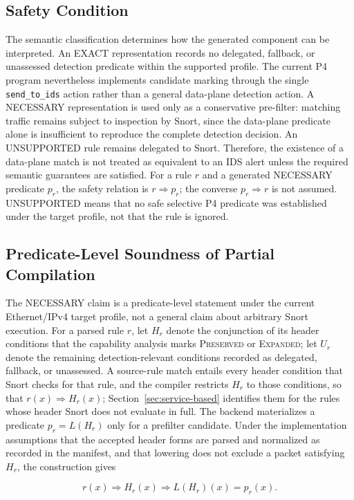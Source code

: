 \documentclass{article}
\begin{document}
\subsection{Safety Condition}
The semantic classification determines how the generated component can
be interpreted. An EXACT representation records no delegated, fallback, or
unassessed detection predicate within the supported profile. The current P4
program nevertheless implements candidate marking through the single
\texttt{send\_to\_ids} action rather than a general data-plane detection
action. A NECESSARY representation is used only as a conservative pre-filter: matching
traffic remains subject to inspection by Snort, since the data-plane
predicate alone is insufficient to reproduce the complete detection
decision. An UNSUPPORTED rule remains delegated to Snort. Therefore,
the existence of a data-plane match is not treated as equivalent to an
IDS alert unless the required semantic guarantees are satisfied.
For a rule $r$ and a generated NECESSARY predicate $p_r$, the safety
relation is $r \Rightarrow p_r$; the converse $p_r \Rightarrow r$ is not
assumed. UNSUPPORTED means that no safe selective P4 predicate was
established under the target profile, not that the rule is ignored.

\subsection{Predicate-Level Soundness of Partial Compilation}
The NECESSARY claim is a predicate-level statement under the current
Ethernet/IPv4 target profile, not a general claim about arbitrary Snort
execution. For a parsed rule $r$, let $H_r$ denote the conjunction of its
header conditions that the capability analysis marks \textsc{Preserved} or
\textsc{Expanded}; let $U_r$ denote the remaining detection-relevant
conditions recorded as delegated, fallback, or unassessed. A source-rule
match entails every header condition that Snort checks for that rule, and
the compiler restricts $H_r$ to those conditions, so that
$r(x) \Rightarrow H_r(x)$; Section~\ref{sec:service-based} identifies them
for the rules whose header Snort does not evaluate in full. The backend materializes a predicate $p_r=L(H_r)$ only for a prefilter
candidate. Under the implementation assumptions that the accepted header
forms are parsed and normalized as recorded in the manifest, and that lowering
does not exclude a packet satisfying $H_r$, the construction gives

\[
r(x) \Rightarrow H_r(x) \Rightarrow L(H_r)(x) = p_r(x).
\]
\end{document}
